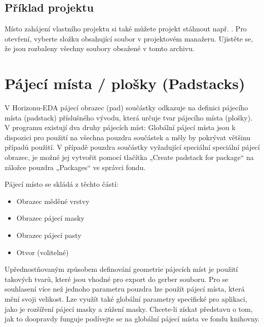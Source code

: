 \documentclass[letterpaper,10pt,czech]{sphinxmanual}
\begin{document}
\section{Příklad projektu}
\label{\detokenize{getting-started_cz:priklad-projektu}}
Místo zahájení vlastního projektu si také můžete projekt stáhnout např. . Pro otevření, vyberte složku obsahující soubor  v projektovém manažeru. Ujistěte se, že jsou rozbaleny všechny soubory obsažené v tomto archivu.


\chapter{Pájecí místa / plošky (Padstacks)}
\label{\detokenize{padstacks_cz:pajeci-mista-plosky-padstacks}}\label{\detokenize{padstacks_cz::doc}}
V Horizonu-EDA pájecí obrazec (pad) součástky odkazuje na definici pájecího místa (padstack) příslušného vývodu, která určuje tvar pájecího místa (plošky). V programu existují dva druhy pájecích míst:
Globální pájecí místa jsou k dispozici pro použití na všechna pouzdra součástek a měly by pokrývat většinu případů použití. V případě pouzdra součástky vyžadující speciální speciální pájecí obrazec, je možné jej vytvořit pomocí tlačítka „Create padstack for package“ na záložce pouzdra „Packages“ ve správci fondu.

Pájecí místo se skládá z těchto částí:
\begin{itemize}
\item {} 
Obrazec měděné vrstvy

\item {} 
Obrazec pájecí masky

\item {} 
Obrazec pájecí pasty

\item {} 
Otvor (volitelné)

\end{itemize}

Upřednostňovaným způsobem definování geometrie pájecích míst je použití takových tvarů, které jsou vhodné pro export do gerber souboru. Pro se souhlasení více než jednoho parametru pouzdra lze použít pájecí místa, která mění svoji velikost. Lze využít také globální parametry specifické pro aplikaci, jako je rozšíření pájecí masky a zúžení masky. Chcete-li získat představu o tom, jak to doopravdy funguje podívejte se na globální pájecí místa ve fondu knihovny.
\end{document}
